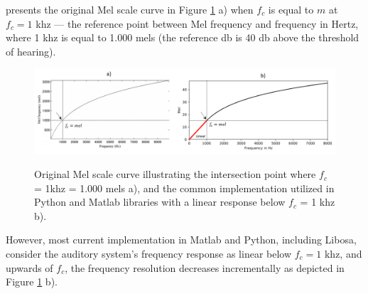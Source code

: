 

\textcite{Park2008} presents the original Mel scale curve in Figure \ref{fig:frmwk_spectral_features_mel_scale} a) when $f_c$ is equal to $m$ at $f_c = 1$ \gls{k}\gls{hz} — the reference point between Mel frequency and frequency in Hertz, where 1 \gls{k}\gls{hz} is equal to 1.000 mels (the reference \gls{db} is 40 \gls{db} above the threshold of hearing). 

\begin{figure}[htbp]
    \raggedright
        \caption{Original Mel scale curve illustrating the intersection point where $f_c$ = 1\gls{k}\gls{hz} = 1.000 mels a), and the common implementation utilized in Python and Matlab libraries with a linear response below $f_c$ = 1 \gls{k}\gls{hz} b).}
        \includegraphics[width=1\textwidth]{resources/images/030-theoretical_framework/Framework_spectral_features_log-mel_scale.png}
        \label{fig:frmwk_spectral_features_mel_scale}
\end{figure}

However, most current implementation in Matlab and Python, including Libosa, consider the auditory system’s frequency response as linear below $f_c = 1$ \gls{k}\gls{hz}, and upwards of $f_c$, the frequency resolution decreases incrementally as depicted in Figure \ref{fig:frmwk_spectral_features_mel_scale} b).  %




